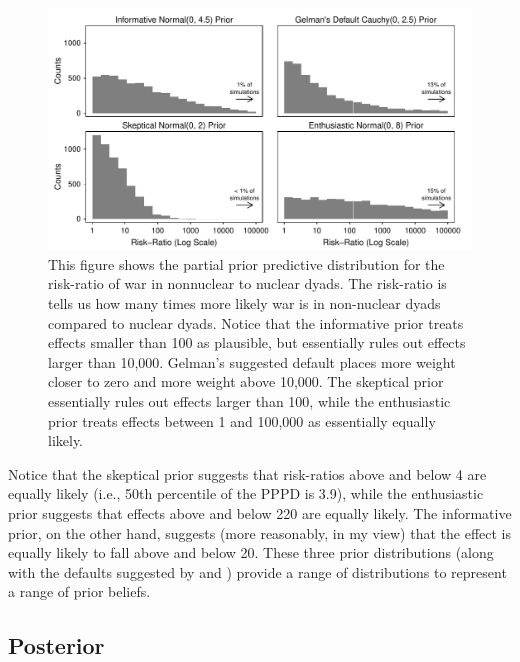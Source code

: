 \documentclass[12pt]{article}
\begin{document}
\begin{figure}[H]
\begin{center}
\includegraphics[scale = .8]{figs/bm-pppd-hist.pdf}
\caption{This figure shows the partial prior predictive distribution for the risk-ratio of war in nonnuclear to nuclear dyads. The risk-ratio is tells us how many times more likely war is in non-nuclear dyads compared to nuclear dyads. Notice that the informative prior treats effects smaller than 100 as plausible, but essentially rules out effects larger than 10,000. Gelman's suggested default places more weight closer to zero and more weight above 10,000. The skeptical prior essentially rules out effects larger than 100, while the enthusiastic prior treats effects between 1 and 100,000 as essentially equally likely.}\label{fig:bm-pppd-hist}
\end{center}
\end{figure}



Notice that the skeptical prior suggests that risk-ratios above and below 4 are equally likely (i.e., 50th percentile of the PPPD is 3.9), while the enthusiastic prior suggests that effects above and below 220 are equally likely. The informative prior, on the other hand, suggests (more reasonably, in my view) that the effect is equally likely to fall above and below 20. These three prior distributions (along with the defaults suggested by \cite{Zorn2005} and \cite{Gelmanetal2008}) provide a range of distributions to represent a range of prior beliefs.

\subsection*{Posterior}
\end{document}
